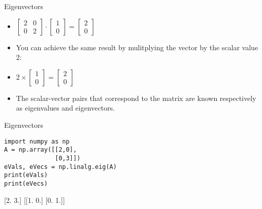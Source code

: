   \begin{frame}[fragile]{Eigenvectors}
\begin{itemize}

\item $\begin{bmatrix}2 & 0\\0 & 2\end{bmatrix} \cdot  \begin{bmatrix}1\\0\end{bmatrix} = \begin{bmatrix}2\\0\end{bmatrix}$
\item You can achieve the same result by mulitplying the vector by the scalar value 2:
\item $2 \times \begin{bmatrix}1\\0\end{bmatrix} = \begin{bmatrix}2\\0\end{bmatrix}$
\item The scalar-vector pairs that correspond to the matrix are known respectively as eigenvalues and eigenvectors. 
\end{itemize}

\end{frame}


  \begin{frame}[fragile]{Eigenvectors}
\begin{lstlisting}
import numpy as np
A = np.array([[2,0],
              [0,3]])
eVals, eVecs = np.linalg.eig(A)
print(eVals)
print(eVecs)
\end{lstlisting}
[2. 3.]
[[1. 0.]
 [0. 1.]]
\end{frame}


